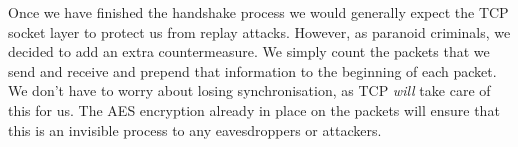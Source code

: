Once we have finished the handshake process we would generally expect the TCP socket layer to protect us from replay attacks. However, as paranoid criminals, we decided to add an extra countermeasure. We simply count the packets that we send and receive and prepend that information to the beginning of each packet. We don't have to worry about losing synchronisation, as TCP \emph{will} take care of this for us. The AES encryption already in place on the packets will ensure that this is an invisible process to any eavesdroppers or attackers.


